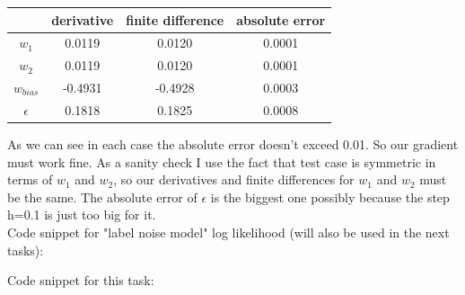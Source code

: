 \documentclass{article}
\begin{document}
\begin{enumerate}[label=(\alph*)]
						\begin{center}
							\begin{tabular}{| c | c | c | c |}
								\hline
								\, & derivative & finite difference & absolute error \\
								\hline
								$w_{1}$ 	& 0.0119 & 0.0120 & 0.0001 \\
								\hline
								$w_{2}$     & 0.0119 & 0.0120 & 0.0001 \\
								\hline
							    $w_{bias}$ &-0.4931 &-0.4928& 0.0003 \\
							    \hline
							    $\epsilon$ & 0.1818 & 0.1825 & 0.0008 \\
							    \hline
							\end{tabular}
						\end{center}
						As we can see in each case the absolute error doesn't exceed 0.01. So our gradient must work fine. As a sanity check I use the fact that test case is symmetric in terms of $w_{1}$ and $w_{2}$, so our derivatives and finite differences for $w_{1}$ and $w_{2}$ must be the same. The absolute error of $\epsilon$ is the biggest one possibly because the step h=0.1 is just too big for it. \\
						Code snippet for "label noise model" log likelihood (will also be used in the next tasks):
						
						Code snippet for this task:
						
						

\end{enumerate}
\end{document}
